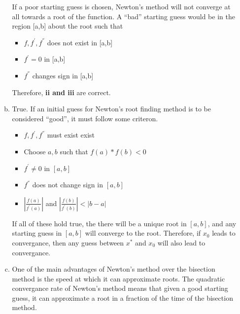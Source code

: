 \documentclass[11pt]{article}
\begin{document}
\begin{enumerate}
\begin{enumerate}[(a)]
			If a poor starting guess is chosen, Newton's method will not converge at all towards a root of the function. A ``bad'' starting guess would be in
			the region [a,b] about the root such that

			\begin{itemize}
				\item $f,f^{'}, f^{''}$ does not exist in [a,b]
				\item $f^{'} = 0$ in [a,b]
				\item $f^{''}$ changes sign in [a,b] \\
			\end{itemize}

			\begin{center}
				Therefore, \textbf{ii and iii} are correct. \\
			\end{center}

			\newpage

		\item True. If an initial guess for Newton's root finding method is to be considered ``good'', it must follow some criteron.
		\begin{itemize}
			\item $f, f^{'}, f^{''}$ must exist exist

			\item Choose $a,b$ such that $f(a)*f(b)<0$

			\item $f^{'} \neq 0$ in $[a,b]$

			\item $f^{''}$ does not change sign in $[a,b]$

			\item $|\frac{f(a)}{f^{'}(a)}|$ and $|\frac{f(b)}{f^{'}(b)}| < |b-a|$
		\end{itemize}

		If all of these hold true, the there will be a unique root in $[a,b]$, and any starting guess in $[a,b]$ will
		converge to the root. Therefore, if $x_0$ leads to convergance, then any guess between $x^*$ and $x_0$ will also
		lead to convergance. \\

		\item One of the main advantages of Newton's method over the bisection method is the speed at which it can approximate roots.
		The quadratic convergance rate of Newton's method means that given a good starting guess, it can approximate a root in a
		fraction of the time of the bisection method.


\end{enumerate}
\end{enumerate}
\end{document}
